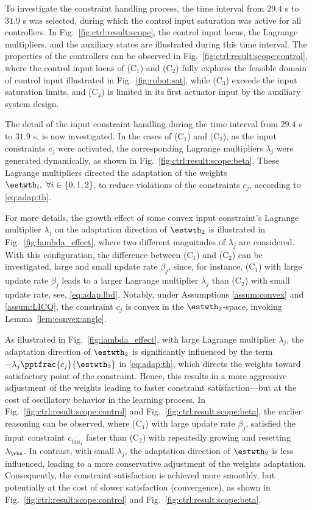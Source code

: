 \documentclass[journal]{IEEEtran}
\begin{document}
To investigate the constraint handling process, the time interval from $29.4$ s to $31.9$ s was selected, during which the control input saturation was active for all controllers.
In Fig.~\ref{fig:ctrl:result:scope}, the control input locus, the Lagrange multipliers, and the auxiliary states are illustrated during this time interval.
The properties of the controllers can be observed in Fig.~\ref{fig:ctrl:result:scope:control}, where the control input locus of (C$_1$) and (C$_2$) fully explores the feasible domain of control input illustrated in Fig.~\ref{fig:robot:sat}, while (C$_3$) exceeds the input saturation limits, and (C$_4$) is limited in its first actuator input by the auxiliary system design.

The detail of the input constraint handling during the time interval from $29.4$ s to $31.9$ s, is now investigated.
In the cases of (C$_1$) and (C$_2$), as the input constraints $c_j$ were activated, the corresponding Lagrange multipliers $\lambda_j$ were generated dynamically, as shown in Fig.~\ref{fig:ctrl:result:scope:beta}.
These Lagrange multipliers directed the adaptation of the weights $\estwth_i,\ \forall i\in\{0,1,2\}$, to reduce violations of the constraints $c_j$, according to \eqref{eq:adap:th}.

For more details, the growth effect of some convex input constraint's Lagrange multiplier $\lambda_j$ on the adaptation direction of $\estwth_2$ is illustrated in Fig.~\ref{fig:lambda_effect}, where two different magnitudes of $\lambda_j$ are considered. 
With this configuration, the difference between (C$_1$) and (C$_2$) can be investigated, \ie large and small update rate $\beta_j$, since, for instance, (C$_1$) with large update rate $\beta_j$ leads to a larger Lagrange multiplier $\lambda_j$ than (C$_2$) with small update rate, see, \eqref{eq:adap:lbd}.
Notably, under Assumptions \ref{assum:convex} and \ref{assum:LICQ}, the constraint $c_j$ is convex in the $\estwth_2$-space, invoking Lemma~\ref{lem:convex:angle}.

As illustrated in Fig.~\ref{fig:lambda_effect}, with large Lagrange multiplier $\lambda_j$, the adaptation direction of $\estwth_2$ is significantly influenced by the term $-\lambda_j\pptfrac{c_j}{\estwth_2}$ in \eqref{eq:adap:th}, which directs the weights toward satisfactory point of the constraint.
Hence, this results in a more aggressive adjustment of the weights leading to faster constraint satisfaction—but at the cost of oscillatory behavior in the learning process.
In Fig.~\ref{fig:ctrl:result:scope:control} and Fig.~\ref{fig:ctrl:result:scope:beta}, the earlier reasoning can be observed, where (C$_1$) with large update rate $\beta_j$, satisfied the input constraint $c_{\overline{tau}_1}$ faster than (C$_2$) with repeatedly growing and resetting $\lambda_{\rbu}$.
In contrast, with small $\lambda_j$, the adaptation direction of $\estwth_2$ is less influenced, leading to a more conservative adjustment of the weights adaptation.
Consequently, the constraint satisfaction is achieved more smoothly, but potentially at the cost of slower satisfaction (convergence), as shown in Fig.~\ref{fig:ctrl:result:scope:control} and Fig.~\ref{fig:ctrl:result:scope:beta}.
\end{document}
